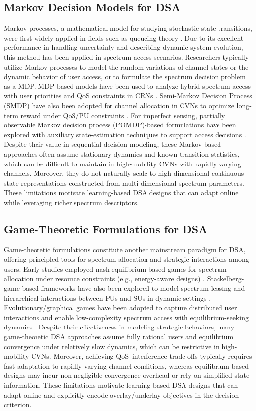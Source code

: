 \documentclass[journal]{IEEEtran}
\begin{document}
\subsection{Markov Decision Models for DSA}
Markov processes, a mathematical model for studying stochastic state transitions, were first widely applied in fields such as queueing theory \cite{ref21}. Due to its excellent performance in handling uncertainty and describing dynamic system evolution, this method has been applied in spectrum access scenarios. Researchers typically utilize Markov processes to model the random variations of channel states or the dynamic behavior of user access, or to formulate the spectrum decision problem as a MDP. MDP-based models have been used to analyze hybrid spectrum access with user priorities and QoS constraints in CRNs \cite{ref22}. Semi-Markov Decision Process (SMDP) have also been adopted for channel allocation in CVNs to optimize long-term reward under QoS/PU constraints \cite{ref23}. For imperfect sensing, partially observable Markov decision process (POMDP)-based formulations have been explored with auxiliary state-estimation techniques to support access decisions \cite{ref24}. Despite their value in sequential decision modeling, these Markov-based approaches often assume stationary dynamics and known transition statistics, which can be difficult to maintain in high-mobility CVNs with rapidly varying channels. Moreover, they do not naturally scale to high-dimensional continuous state representations constructed from multi-dimensional spectrum parameters. These limitations motivate learning-based DSA designs that can adapt online while leveraging richer spectrum descriptors.\par
\subsection{Game-Theoretic Formulations for DSA}
Game-theoretic formulations constitute another mainstream paradigm for DSA, offering principled tools for spectrum allocation and strategic interactions among users. Early studies employed nash-equilibrium-based games for spectrum allocation under resource constraints (e.g., energy-aware designs) \cite{ref25}. Stackelberg-game-based frameworks have also been explored to model spectrum leasing and hierarchical interactions between PUs and SUs in dynamic settings \cite{ref26}. Evolutionary/graphical games have been adopted to capture distributed user interactions and enable low-complexity spectrum access with equilibrium-seeking dynamics \cite{ref27}. Despite their effectiveness in modeling strategic behaviors, many game-theoretic DSA approaches assume fully rational users and equilibrium convergence under relatively slow dynamics, which can be restrictive in high-mobility CVNs. Moreover, achieving QoS–interference trade-offs typically requires fast adaptation to rapidly varying channel conditions, whereas equilibrium-based designs may incur non-negligible convergence overhead or rely on simplified state information. These limitations motivate learning-based DSA designs that can adapt online and explicitly encode overlay/underlay objectives in the decision criterion.
\par
\end{document}
